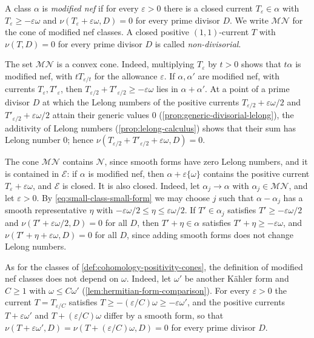 \begin{definition}\label{def:modified-nef-class}
A class $\alpha$ is \emph{modified nef} if for every $\varepsilon>0$ there is a closed current $T_\varepsilon\in\alpha$ with $T_\varepsilon\geq-\varepsilon\omega$ and $\nu(T_\varepsilon+\varepsilon\omega,D)=0$ for every prime divisor $D$. We write $\mathcal{MN}$ for the cone of modified nef classes. A closed positive $(1,1)$-current $T$ with $\nu(T,D)=0$ for every prime divisor $D$ is called \emph{non-divisorial}.
\end{definition}
The set $\mathcal{MN}$ is a convex cone. Indeed, multiplying $T_\varepsilon$ by $t>0$ shows that $t\alpha$ is modified nef, with $tT_{\varepsilon/t}$ for the allowance $\varepsilon$. If $\alpha,\alpha'$ are modified nef, with currents $T_\varepsilon,T'_\varepsilon$, then $T_{\varepsilon/2}+T'_{\varepsilon/2}\geq-\varepsilon\omega$ lies in $\alpha+\alpha'$. At a point of a prime divisor $D$ at which the Lelong numbers of the positive currents $T_{\varepsilon/2}+\varepsilon\omega/2$ and $T'_{\varepsilon/2}+\varepsilon\omega/2$ attain their generic values $0$ (\cref{prop:generic-divisorial-lelong}), the additivity of Lelong numbers (\cref{prop:lelong-calculus}) shows that their sum has Lelong number $0$; hence $\nu(T_{\varepsilon/2}+T'_{\varepsilon/2}+\varepsilon\omega,D)=0$.

The cone $\mathcal{MN}$ contains $\mathcal N$, since smooth forms have zero Lelong numbers, and it is contained in $\mathcal E$: if $\alpha$ is modified nef, then $\alpha+\varepsilon\{\omega\}$ contains the positive current $T_\varepsilon+\varepsilon\omega$, and $\mathcal E$ is closed. It is also closed. Indeed, let $\alpha_j\to\alpha$ with $\alpha_j\in\mathcal{MN}$, and let $\varepsilon>0$. By \eqref{eq:small-class-small-form} we may choose $j$ such that $\alpha-\alpha_j$ has a smooth representative $\eta$ with $-\varepsilon\omega/2\leq\eta\leq\varepsilon\omega/2$. If $T'\in\alpha_j$ satisfies $T'\geq-\varepsilon\omega/2$ and $\nu(T'+\varepsilon\omega/2,D)=0$ for all $D$, then $T'+\eta\in\alpha$ satisfies $T'+\eta\geq-\varepsilon\omega$, and $\nu(T'+\eta+\varepsilon\omega,D)=0$ for all $D$, since adding smooth forms does not change Lelong numbers.

As for the classes of \cref{def:cohomology-positivity-cones}, the definition of modified nef classes does not depend on $\omega$. Indeed, let $\omega'$ be another K\"ahler form and $C\geq1$ with $\omega\leq C\omega'$ (\cref{lem:hermitian-form-comparison}). For every $\varepsilon>0$ the current $T=T_{\varepsilon/C}$ satisfies $T\geq-(\varepsilon/C)\omega\geq-\varepsilon\omega'$, and the positive currents $T+\varepsilon\omega'$ and $T+(\varepsilon/C)\omega$ differ by a smooth form, so that $\nu(T+\varepsilon\omega',D)=\nu(T+(\varepsilon/C)\omega,D)=0$ for every prime divisor $D$.

